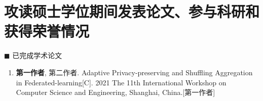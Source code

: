 \chapter*{\large 攻读硕士学位期间发表论文、参与科研和获得荣誉情况}
\vskip 2mm
\vspace{-1cm}
\renewcommand{\labelenumi}{[\arabic{enumi}]}
{\heiti $\blacksquare$ 已完成学术论文}\vskip 3mm
\begin{enumerate}
    \item \textbf{第一作者}, 第二作者. Adaptive Privacy-preserving and Shuffling Aggregation in Federated-learning[C]. 2021 The 11th International Workshop on Computer Science and Engineering, Shanghai, China.[第一作者]

\end{enumerate}

